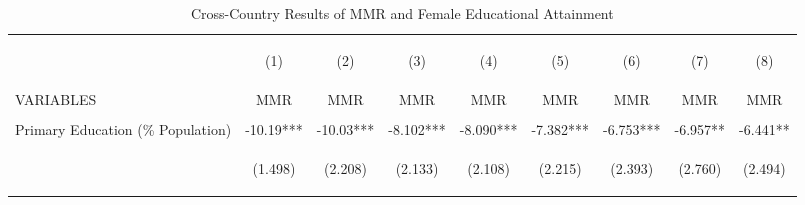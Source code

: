 \begin{landscape}\begin{table}[htpb!]\begin{center}\caption{Cross-Country Results of MMR and Female Educational Attainment}\label{MMRtab:MMRpercent}\begin{tabular}{lcccccccc}\toprule&\begin{footnotesize}(1)\end{footnotesize}&\begin{footnotesize}(2)\end{footnotesize}&\begin{footnotesize}(3)\end{footnotesize}&\begin{footnotesize}(4)\end{footnotesize}&\begin{footnotesize}(5)\end{footnotesize}&\begin{footnotesize}(6)\end{footnotesize}&\begin{footnotesize}(7)\end{footnotesize}&\begin{footnotesize}(8) \end{footnotesize}\\
VARIABLES&MMR&MMR&MMR&MMR&MMR&MMR&MMR&MMR\\ \midrule
&&&&&&&&\\
Primary Education (\% Population) &-10.19***&-10.03***&-8.102***&-8.090***&-7.382***&-6.753***&-6.957**&-6.441**\\
&\begin{footnotesize}(1.498)\end{footnotesize}&\begin{footnotesize}(2.208)\end{footnotesize}&\begin{footnotesize}(2.133)\end{footnotesize}&\begin{footnotesize}(2.108)\end{footnotesize}&\begin{footnotesize}(2.215)\end{footnotesize}&\begin{footnotesize}(2.393)\end{footnotesize}&\begin{footnotesize}(2.760)\end{footnotesize}&\begin{footnotesize}(2.494)\end{footnotesize}\\

\end{tabular}
\end{center}
\end{table}
\end{landscape}
